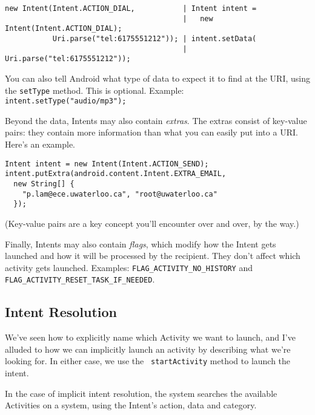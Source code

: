 {\scriptsize
\begin{lstlisting}
new Intent(Intent.ACTION_DIAL,           | Intent intent = 
                                         |   new Intent(Intent.ACTION_DIAL);
           Uri.parse("tel:6175551212")); | intent.setData(
                                         |   Uri.parse("tel:6175551212"));
\end{lstlisting}
}

You can also tell Android what type of data to expect it to find at
the URI, using the {\tt setType} method. This is optional. Example: {\tt
  intent.setType("audio/mp3");}


Beyond the data, Intents may also contain \emph{extras}. The extras
consist of key-value pairs: they contain more information than what you
can easily put into a URI. Here's an example.

{\small 
\begin{lstlisting}
Intent intent = new Intent(Intent.ACTION_SEND);
intent.putExtra(android.content.Intent.EXTRA_EMAIL,
  new String[] {
    "p.lam@ece.uwaterloo.ca", "root@uwaterloo.ca"
  });
\end{lstlisting}
}

(Key-value pairs are a key concept you'll encounter over and over, by
  the way.)

Finally, Intents may also contain \emph{flags}, which modify how the
Intent gets launched and how it will be processed by the recipient. 
They don't affect which activity gets launched. Examples: {\tt FLAG\_ACTIVITY\_NO\_HISTORY} and 
{\tt FLAG\_ACTIVITY\_RESET\_TASK\_IF\_NEEDED}.

\subsection*{Intent Resolution}
We've seen how to explicitly name which Activity we want to launch,
and I've alluded to how we can implicitly launch an activity by
describing what we're looking for. In either case, we use the {\tt
  startActivity} method to launch the intent.

In the case of implicit intent resolution, the system searches the
available Activities on a system, using the Intent's action, data
and category.

